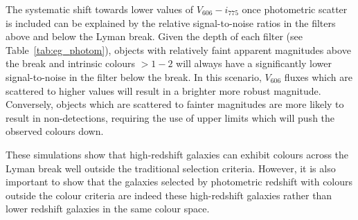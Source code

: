 The systematic shift towards lower values of $V_{606} - i_{775}$ once photometric scatter is included can be explained by the relative signal-to-noise ratios in the filters above and below the Lyman break. Given the depth of each filter (see Table~\ref{tab:eg_photom}), objects with relatively faint apparent magnitudes above the break and intrinsic colours $> 1-2$ will always have a significantly lower signal-to-noise in the filter below the break. In this scenario, $V_{606}$ fluxes which are scattered to higher values will result in a brighter more robust magnitude. Conversely, objects which are scattered to fainter magnitudes are more likely to result in non-detections, requiring the use of upper limits which will push the observed colours down.

These simulations show that high-redshift galaxies can exhibit colours across the Lyman break well outside the traditional selection criteria. However, it is also important to show that the galaxies selected by photometric redshift with colours outside the colour criteria are indeed these high-redshift galaxies rather than lower redshift galaxies in the same colour space.

